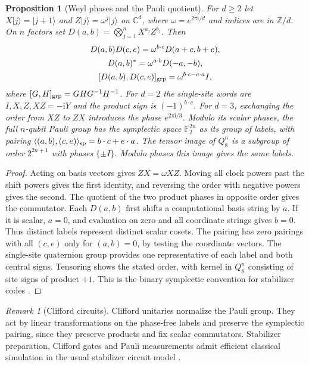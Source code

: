 \documentclass[11pt,reqno]{amsart}
\newtheorem{proposition}[theorem]{Proposition}
\theoremstyle{definition}
\theoremstyle{remark}
\newtheorem{remark}[theorem]{Remark}
\numberwithin{equation}{section}
\newcommand{\C}{\mathbb{C}}
\newcommand{\Z}{\mathbb{Z}}
\begin{document}
\begin{proposition}[Weyl phases and the Pauli quotient]\label{m7:weyl}
For $d\ge2$ let $X\lvert j\rangle=\lvert j+1\rangle$ and
$Z\lvert j\rangle=\omega^j\lvert j\rangle$ on $\C^d$, where
$\omega=e^{2\pi\mathrm i/d}$ and indices are in $\Z/d$.
On $n$ factors set $D(a,b)=\bigotimes_{j=1}^n X^{a_j} Z^{b_j}$.
Then
\[
\begin{gathered}
 D(a,b)D(c,e)=\omega^{b\cdot c}D(a+c,b+e),\\
 D(a,b)^*=\omega^{a\cdot b}D(-a,-b),\\
 [D(a,b),D(c,e)]_{\rm grp}=\omega^{b\cdot c-e\cdot a}I ,
\end{gathered}
\]
where $[G,H]_{\rm grp}=GHG^{-1}H^{-1}$.
For $d=2$ the single-site words are $I,X,Z,XZ=-\mathrm iY$ and
the product sign is $(-1)^{b\cdot c}$. For $d=3$, exchanging the
order from $XZ$ to $ZX$ introduces the phase $e^{2\pi\mathrm i/3}$. Modulo its scalar phases, the full $n$-qubit
Pauli group has the symplectic space $\mathbb F_2^{2n}$ as its group
of labels, with pairing
$\langle(a,b),(c,e)\rangle_{\rm sp}=b\cdot c+e\cdot a$.
The tensor image of $Q_8^n$ is a subgroup of order $2^{2n+1}$
with phases $\{\pm I\}$. Modulo phases this image gives the same labels.
\end{proposition}
\begin{proof}
Acting on basis vectors gives $ZX=\omega XZ$. Moving all clock
powers past the shift powers gives the first identity, and
reversing the order with negative powers gives the second.
The quotient of the two product phases in opposite order
gives the commutator. Each $D(a,b)$ first shifts a computational
basis string by $a$. If it is scalar, $a=0$, and evaluation on zero
and all coordinate strings gives $b=0$. Thus distinct labels
represent distinct scalar cosets. The pairing has zero pairings
with all $(c,e)$ only for $(a,b)=0$, by testing the coordinate
vectors. The single-site quaternion group provides one
representative of each label and both central signs. Tensoring
shows the stated order, with kernel in $Q_8^n$ consisting of site
signs of product $+1$. This is the binary symplectic convention
for stabilizer codes \cite[Chs.~2--3]{m7:Gottesman}.
\end{proof}

\begin{remark}[Clifford circuits]\label{m7:clifford-circuits}
Clifford unitaries normalize the Pauli group. They act by
linear transformations on the phase-free labels and preserve
the symplectic pairing, since they preserve products and fix scalar
commutators. Stabilizer preparation, Clifford gates and Pauli
measurements admit efficient classical simulation in the usual
stabilizer circuit model \cite{m7:Gottesman,m7:AaronsonGottesman}.
\end{remark}
\end{document}
